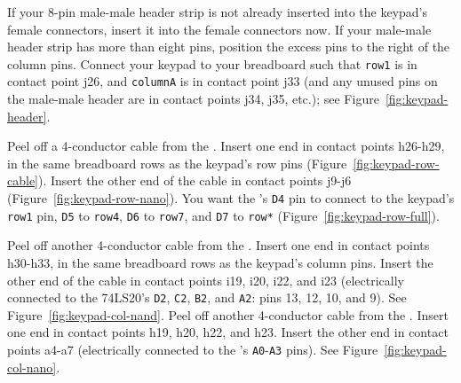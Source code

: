 If your 8-pin male-male header strip is not already inserted into the keypad's female connectors, insert it into the female connectors now.
If your male-male header strip has more than eight pins, position the excess pins to the right of the column pins.
Connect your keypad to your breadboard such that \texttt{row1} is in contact point j26, and \texttt{columnA} is in contact point j33 (and any unused pins on the male-male header are in contact points j34, j35, etc.);
see Figure~\ref{fig:keypad-header}.

Peel off a 4-conductor cable from the \rainbow.
Insert one end in contact points h26-h29, in the same breadboard rows as the keypad's row pins (Figure~\ref{fig:keypad-row-cable}).
Insert the other end of the cable in contact points j9-j6 (Figure~\ref{fig:keypad-row-nano}).
You want the \developmentboard's \texttt{D4} pin to connect to the keypad's \texttt{row1} pin, \texttt{D5} to \texttt{row4}, \texttt{D6} to \texttt{row7}, and \texttt{D7} to \texttt{row*} (Figure~\ref{fig:keypad-row-full}).

Peel off another 4-conductor cable from the \rainbow.
Insert one end in contact points h30-h33, in the same breadboard rows as the keypad's column pins.
Insert the other end of the cable in contact points i19, i20, i22, and i23 (electrically connected to the 74LS20's \texttt{D2}, \texttt{C2}, \texttt{B2}, and \texttt{A2}: pins 13, 12, 10, and 9).
See Figure~\ref{fig:keypad-col-nand}.
Peel off another 4-conductor cable from the \rainbow.
Insert one end in contact points h19, h20, h22, and h23.
Insert the other end in contact points a4-a7 (electrically connected to the \developmentboard's \texttt{A0}-\texttt{A3} pins).
See Figure~\ref{fig:keypad-col-nano}.

